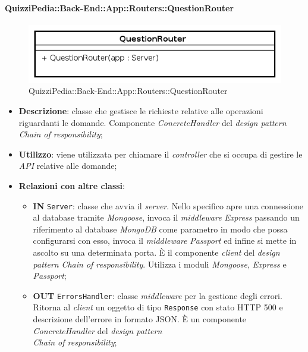\paragraph{QuizziPedia::Back-End::App::Routers::QuestionRouter}
\begin{figure}[ht]
	\centering
	\includegraphics[scale=0.8]{UML/Package/QuizziPedia_Back-End_App_Routers_questionRouter.png}
	\caption{QuizziPedia::Back-End::App::Routers::QuestionRouter}
\end{figure}
\FloatBarrier
	\begin{itemize}
		\item \textbf{Descrizione}: classe che gestisce le richieste relative alle operazioni riguardanti le domande. Componente \textit{ConcreteHandler} del \textit{design pattern} \textit{Chain of responsibility};
		\item \textbf{Utilizzo}: viene utilizzata per chiamare il \textit{controller} che si occupa di gestire le \textit{API} relative alle domande;
		\item \textbf{Relazioni con altre classi}:
		\begin{itemize}
			\item \textbf{IN} \texttt{Server}: classe che avvia il \textit{server}. Nello specifico apre una connessione al database tramite \textit{Mongoose}, invoca il \textit{middleware} \textit{Express} passando un riferimento al database \textit{MongoDB} come parametro in modo che possa configurarsi con esso, invoca il \textit{middleware} \textit{Passport} ed infine si mette in ascolto su una determinata porta. È il componente \textit{client} del \textit{design pattern} \textit{Chain of responsibility}. Utilizza i moduli \textit{Mongoose}, \textit{Express} e \textit{Passport};
			\item \textbf{OUT} \texttt{ErrorsHandler}: classe \textit{middleware} per la gestione degli errori. Ritorna al \textit{client} un oggetto di tipo \texttt{Response} con stato HTTP 500 e descrizione dell'errore in formato JSON. È un componente \textit{ConcreteHandler} del \textit{design pattern} \\\textit{Chain of responsibility};

\end{itemize}
\end{itemize}
